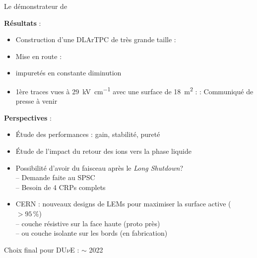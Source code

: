     \begin{frame}{Le démonstrateur de \SSS{}}
        \begin{scriptsize}
            \textbf{Résultats} :
            \begin{itemize}
                \item Construction d'une DLArTPC de très grande taille : \textcolor{green}{\checkmark}
                \item Mise en route : \textcolor{green}{\checkmark}
                \item impuretés en constante diminution
                \item 1ère traces
                    \iftracks vues à \SI{29}{\kilo\volt\per\centi\meter} avec une surface de \SI{18}{\meter\squared}  : \textcolor{green}{\checkmark} \else : Communiqué de presse à venir \fi
            \end{itemize}\vspace{0.2cm}\pause
            \textbf{Perspectives} :
            \begin{itemize}
                \item Étude des performances : gain, stabilité, pureté
                \item Étude de l'impact du retour des ions vers la phase liquide
                \item Possibilité d'avoir du faisceau après le \textit{Long Shutdown}? \\
                -- Demande faite au SPSC\\
                -- Besoin de 4 CRPs complets
                \item CERN : nouveaux designs de LEMs pour maximiser la surface active ($>95\,\%$) \\
                    -- couche résistive sur la face haute (proto près)\\
                    -- ou couche isolante sur les bords (en fabrication)
            \end{itemize}
            Choix final pour DU$\nu$E : $\sim$ 2022
        \end{scriptsize}
    \end{frame}


